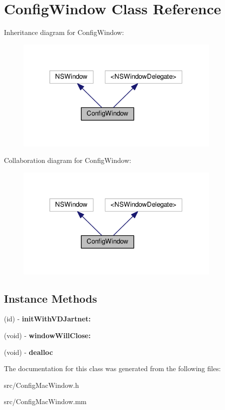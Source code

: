 \hypertarget{interfaceConfigWindow}{}\section{Config\+Window Class Reference}
\label{interfaceConfigWindow}


Inheritance diagram for Config\+Window\+:
\nopagebreak
\begin{figure}[H]
\begin{center}
\leavevmode
\includegraphics[width=282pt]{interfaceConfigWindow__inherit__graph}
\end{center}
\end{figure}


Collaboration diagram for Config\+Window\+:
\nopagebreak
\begin{figure}[H]
\begin{center}
\leavevmode
\includegraphics[width=282pt]{interfaceConfigWindow__coll__graph}
\end{center}
\end{figure}
\subsection*{Instance Methods}
\begin{DoxyCompactItemize}
\item 
\mbox{\label{interfaceConfigWindow_ab2883e7f9ae7853c7452a619d5012a0e}} 
(id) -\/ {\bfseries init\+With\+V\+D\+Jartnet\+:}
\item 
\mbox{\label{interfaceConfigWindow_a3b50bd15c0c1c0421c109383ca7c254d}} 
(void) -\/ {\bfseries window\+Will\+Close\+:}
\item 
\mbox{\label{interfaceConfigWindow_a85c13f2a3a80aabd6b71e66b679fa81e}} 
(void) -\/ {\bfseries dealloc}
\end{DoxyCompactItemize}


The documentation for this class was generated from the following files\+:\begin{DoxyCompactItemize}
\item 
src/Config\+Mac\+Window.\+h\item 
src/Config\+Mac\+Window.\+mm\end{DoxyCompactItemize}
